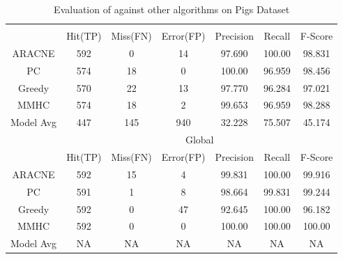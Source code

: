 \begin{table}[th]
\begin{center}
\caption{\label{tab:pigsComp}Evaluation of \lama{} against other algorithms on Pigs Dataset}
\small
\begin{tabular}{|c|c|c|c|c|c|c|}
\hline
 &\multicolumn{6}{c|}{\lama{}}\\
\cline{2-7}
 & Hit(TP) & Miss(FN) & Error(FP) & Precision & Recall & F-Score  \\
\hline
ARACNE & 592 & 0  & 14& 97.690 & 100.00 & 98.831 \\
PC     & 574 & 18 & 0 & 100.00 & 96.959 & 98.456 \\
Greedy & 570 & 22 & 13& 97.770 & 96.284 & 97.021 \\
MMHC   & 574 & 18 & 2 & 99.653 & 96.959 & 98.288 \\
\hline
Model Avg & 447 & 145 & 940 & 32.228 & 75.507 & 45.174 \\
\hline \hline
 &\multicolumn{6}{c|}{Global}\\
\cline{2-7}
 & Hit(TP) & Miss(FN) & Error(FP) & Precision & Recall & F-Score \\
\hline
ARACNE & 592& 15 & 4 & 99.831 & 100.00 & 99.916 \\
PC     & 591& 1  & 8 & 98.664 & 99.831 & 99.244 \\
Greedy & 592& 0  & 47& 92.645 & 100.00 & 96.182 \\
MMHC   & 592& 0  & 0 & 100.00 & 100.00 & 100.00 \\
\hline
Model Avg & NA & NA & NA & NA & NA & NA \\
\hline
\end{tabular}
\end{center}
\end{table}

